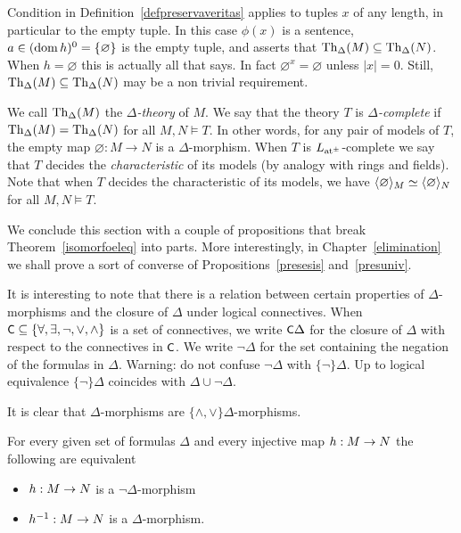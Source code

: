 \begin{remark}\label{rmk_characteristic}
Condition  in Definition~\ref{defpreservaveritas} applies to tuples $x$ of any length, in particular to the empty tuple.
In this case $\phi(x)$ is a sentence, $a\in(\mathop{\rm dom} h)^0=\{\varnothing\}$ is the empty tuple, and  asserts that ${\rm Th}_\Delta(M)\subseteq{\rm Th}_\Delta(N)$.
When $h=\varnothing$ this is actually all that  says.
In fact $\varnothing^{x}=\varnothing$ unless $|x|=0$.
Still,  ${\rm Th}_\Delta(M)\subseteq{\rm Th}_\Delta(N)$ may be a non trivial requirement.
\end{remark}


\begin{definition}\label{def_characteristic}
We call ${\rm Th}_\Delta(M)$ the \emph{$\Delta$-theory} of $M$.
We say that the theory $T$ is \emph{$\Delta$-complete\/} if ${\rm Th}_\Delta(M)={\rm Th}_\Delta(N)$ for all $M,N\models T$.
In other words, for any pair of models of $T$, the empty map $\varnothing:M\to N$ is a $\Delta$-morphism.
When $T$ is $L_{\rm at^{\scriptscriptstyle\pm}}$-complete we say that $T$ decides the \emph{characteristic\/} of its models (by analogy with rings and fields). Note that when $T$ decides the characteristic of its models, we have $\langle\varnothing\rangle_M\simeq\langle\varnothing\rangle_N$ for all $M,N\models T$.
\end{definition}

We conclude this section with a couple of propositions that break Theorem~\ref{isomorfoeleq} into parts.
More interestingly, in Chapter~\ref{elimination} we shall prove a sort of converse of Propositions~\ref{presesis} and~\ref{presuniv}.

It is interesting to note that there is a relation between certain properties of $\Delta$-morphisms and the closure of $\Delta$ under logical connectives.
When $\textsf{\small C}\subseteq\{\forall,\exists,\neg,\vee,\wedge\}$ is a set of connectives, we write \emph{$\textsf{\small C}\Delta$} for the closure of $\Delta$ with respect to the connectives in $\textsf{\small C}$.
We write \emph{$\neg\Delta$} for the set containing the negation of the formulas in $\Delta$.
Warning: do not confuse $\neg\Delta$ with $\{\neg\}\Delta$. Up to logical equivalence $\{\neg\}\Delta$ coincides with $\Delta\cup\neg\Delta$.

It is clear that $\Delta$-morphisms are $\{\wedge,\vee\}\Delta$-morphisms.

\begin{proposition}\label{presneg}
For every given set of formulas $\Delta$ and every injective map $h:M\rightarrow N$ the following are equivalent
\begin{itemize}
\item[a.] $h:M\rightarrow N$ is a $\neg\Delta$-morphism
\item[b.] $h^{-1}:M\rightarrow N$ is a $\Delta$-morphism.
\end{itemize}
\end{proposition}


